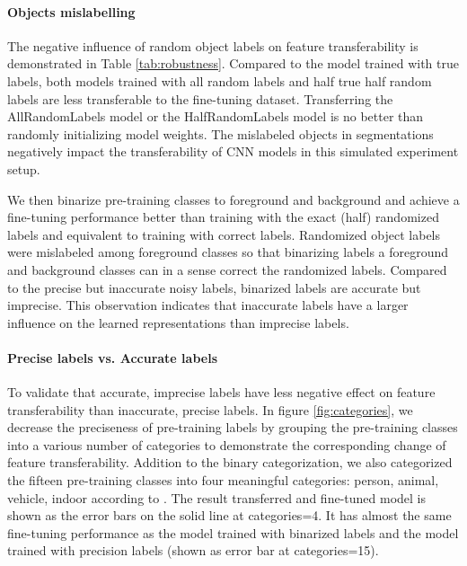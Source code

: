 
\paragraph{Objects mislabelling}
The negative influence of random object labels on feature transferability is demonstrated in Table \ref{tab:robustness}.
Compared to the model trained with true labels, both models trained with all random labels and half true half random labels are less transferable to the fine-tuning dataset.
Transferring the AllRandomLabels model or the HalfRandomLabels model is no better than randomly initializing model weights.
The mislabeled objects in segmentations negatively impact the transferability of CNN models in this simulated experiment setup.

We then binarize pre-training classes to foreground and background and achieve a fine-tuning performance better than training with the exact (half) randomized labels and equivalent to training with correct labels.
Randomized object labels were mislabeled among foreground classes so that binarizing labels a foreground and background classes can in a sense correct the randomized labels.
Compared to the precise but inaccurate noisy labels, binarized labels are accurate but imprecise.
This observation indicates that inaccurate labels have a larger influence on the learned representations than imprecise labels.


\paragraph{Precise labels vs. Accurate labels}
To validate that accurate, imprecise labels have less negative effect on feature transferability than inaccurate, precise labels.
In figure \ref{fig:categories}, we decrease the preciseness of pre-training labels by grouping the pre-training classes into a various number of categories to demonstrate the corresponding change of feature transferability.
Addition to the binary categorization, we also categorized the fifteen pre-training classes into four meaningful categories: person, animal, vehicle, indoor according to \cite{everingham2015pascal}.
The result transferred and fine-tuned model is shown as the error bars on the solid line at categories=4.
It has almost the same fine-tuning performance as the model trained with binarized labels and the model trained with precision labels (shown as error bar at categories=15).


